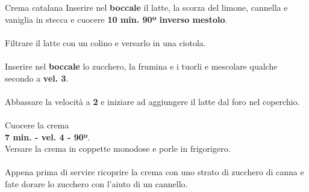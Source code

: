 \documentclass{book}
\begin{document}
    \begin{recipe}  {Crema catalana} {}{}
        Inserire nel \textbf{boccale} il latte, la scorza del limone, cannella e vaniglia in stecca e cuocere \textbf{10 min. 90º inverso mestolo}.\\\\
        Filtrare il latte con un colino e versarlo in una ciotola.\\\\
        Inserire nel \textbf{boccale} lo zucchero, la frumina e i tuorli e mescolare qualche secondo a \textbf{vel. 3}.\\\\
        Abbassare la velocità a \textbf{2} e iniziare ad aggiungere il latte dal foro nel coperchio.\\\\
        Cuocere la crema\\ \textbf{7 min. - vel. 4 - 90º}.\\
        Versare la crema in coppette monodose e porle in frigorigero.\\\\
        Appena prima di servire ricoprire la crema con uno strato di zucchero di canna e fate dorare lo zucchero con l'aiuto di un cannello.\\



    \end{recipe}
\end{document}
